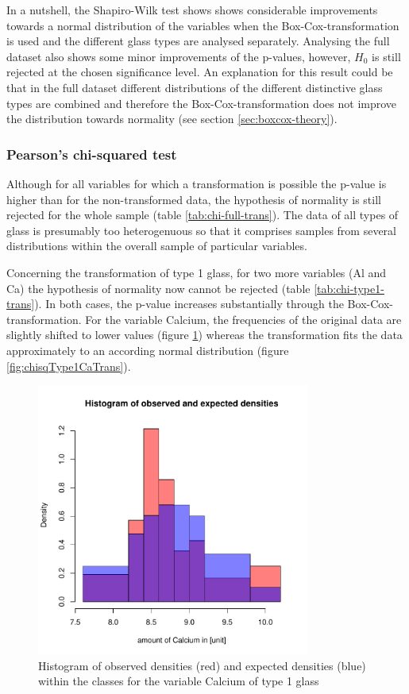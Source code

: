 \documentclass[a4paper, 12pt, titlepage, headsepline, listof = totoc, bibliography = totoc, numbers = noenddot]{scrartcl}
\begin{document}
In a nutshell, the Shapiro-Wilk test shows shows considerable improvements towards a normal distribution of the variables when the Box-Cox-transformation is used and the different glass types are analysed separately. Analysing the full dataset also shows some minor improvements of the p-values, however, $H_0$ is still rejected at the chosen significance level. An explanation for this result could be that in the full dataset different distributions of the different distinctive glass types are combined and therefore the Box-Cox-transformation does not improve the distribution towards normality (see section \ref{sec:boxcox-theory}).







\subsubsection{Pearson's chi-squared test}
Although for all variables for which a transformation is possible the p-value is higher than for the non-transformed data, the hypothesis of normality is still rejected for the whole sample (table \ref{tab:chi-full-trans}). The data of all types of glass is presumably too heterogenuous so that it comprises samples from several distributions within the overall sample of particular variables.

Concerning the transformation of type 1 glass, for two more variables (Al and Ca) the hypothesis of normality now cannot be rejected (table \ref{tab:chi-type1-trans}). In both cases, the p-value increases substantially through the Box-Cox-transformation. For the variable Calcium, the frequencies of the original data are slightly shifted to lower values (figure \ref{fig:chisqType1Ca}) whereas the transformation fits the data approximately to an according normal distribution (figure \ref{fig:chisqType1CaTrans}).

\begin{figure}[h!]
\centering
\includegraphics[width=0.8\textwidth]{report-chisqType1Ca}
\caption{Histogram of observed densities (red) and expected densities (blue) within the classes for the variable Calcium of type 1 glass}
\label{fig:chisqType1Ca}
\end{figure}
\end{document}
